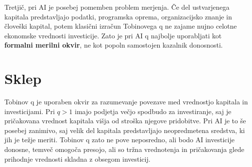 \documentclass[12pt,a4paper]{article}
\begin{document}
Tretjič, pri AI je posebej pomemben problem merjenja. Če del ustvarjenega kapitala 
predstavljajo podatki, programska oprema, organizacijsko znanje in človeški kapital, 
potem klasični izračun Tobinovega q ne zajame nujno celotne ekonomske vrednosti investicije. 
Zato je pri AI q najbolje uporabljati kot \textbf{formalni merilni okvir}, ne kot popoln 
samostojen kazalnik donosnosti.


\section{Sklep}
Tobinov q je uporaben okvir za razumevanje povezave med vrednostjo kapitala in investicijami. 
Pri \(q>1\) imajo podjetja večjo spodbudo za investiranje, saj je pričakovana vrednost kapitala 
višja od stroška njegove pridobitve. Pri AI je to še posebej zanimivo, saj velik del kapitala 
predstavljajo neopredmetena sredstva, ki jih je težje meriti. Tobinov q zato ne pove neposredno, 
ali bodo AI investicije donosne, temveč omogoča presojo, ali so tržna vrednotenja in 
pričakovanja glede prihodnje vrednosti skladna z obsegom investicij.
\end{document}
